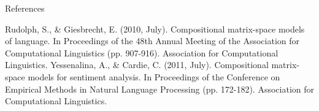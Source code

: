 \documentclass[12pt,a4paper]{beamer}
\begin{document}
\begin{frame}[allowframebreaks]{References}
\begin{thebibliography}{-}
 Rudolph, S., \& Giesbrecht, E. (2010, July). Compositional matrix-space models of language. In Proceedings of the 48th Annual Meeting of the Association for Computational Linguistics (pp. 907-916). Association for Computational Linguistics.
 Yessenalina, A., \& Cardie, C. (2011, July). Compositional matrix-space models for sentiment analysis. In Proceedings of the Conference on Empirical Methods in Natural Language Processing (pp. 172-182). Association for Computational Linguistics.
\end{thebibliography}
\end{frame}
\end{document}
